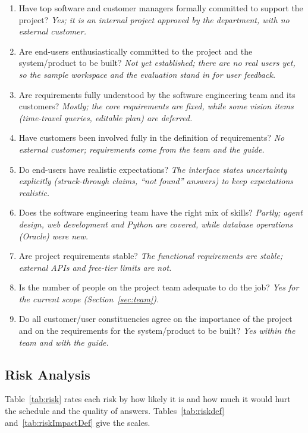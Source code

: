 \documentclass[oneside,a4paper,12pt]{report}
\begin{document}
\begin{enumerate}
\item Have top software and customer managers formally committed to support the project? \emph{Yes; it is an internal project approved by the department, with no external customer.}
\item Are end-users enthusiastically committed to the project and the system/product to be built? \emph{Not yet established; there are no real users yet, so the sample workspace and the evaluation stand in for user feedback.}
\item Are requirements fully understood by the software engineering team and its customers? \emph{Mostly; the core requirements are fixed, while some vision items (time-travel queries, editable plan) are deferred.}
\item Have customers been involved fully in the definition of requirements? \emph{No external customer; requirements come from the team and the guide.}
\item Do end-users have realistic expectations? \emph{The interface states uncertainty explicitly (struck-through claims, ``not found'' answers) to keep expectations realistic.}
\item Does the software engineering team have the right mix of skills? \emph{Partly; agent design, web development and Python are covered, while database operations (Oracle) were new.}
\item Are project requirements stable? \emph{The functional requirements are stable; external APIs and free-tier limits are not.}
\item Is the number of people on the project team adequate to do the job? \emph{Yes for the current scope (Section~\ref{sec:team}).}
\item Do all customer/user constituencies agree on the importance of the project and on the requirements for the system/product to be built? \emph{Yes within the team and with the guide.}
\end{enumerate}

\subsection{Risk Analysis}
Table~\ref{tab:risk} rates each risk by how likely it is and how much it would hurt the schedule and the quality of answers. Tables~\ref{tab:riskdef} and~\ref{tab:riskImpactDef} give the scales.
\end{document}
